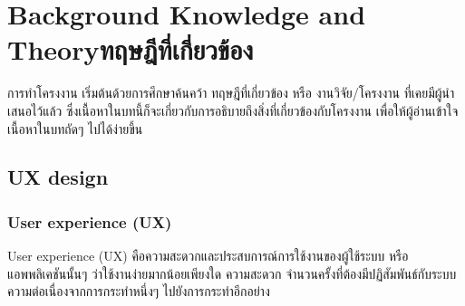 \chapter{\ifenglish Background Knowledge and Theory\else ทฤษฎีที่เกี่ยวข้อง\fi}

การทำโครงงาน เริ่มต้นด้วยการศึกษาค้นคว้า ทฤษฎีที่เกี่ยวข้อง หรือ งานวิจัย/โครงงาน 
ที่เคยมีผู้นำเสนอไว้แล้ว ซึ่งเนื้อหาในบทนี้ก็จะเกี่ยวกับการอธิบายถึงสิ่งที่เกี่ยวข้องกับโครงงาน 
เพื่อให้ผู้อ่านเข้าใจเนื้อหาในบทถัดๆ ไปได้ง่ายขึ้น

\section{UX design}
\subsection{User experience (UX)}
User experience (UX) คือความสะดวกและประสบการณ์การใช้งานของผู้ใช้ระบบ 
หรือแอพพลิเคชันนั้นๆ ว่าใช้งานง่ายมากน้อยเพียงใด ความสะดวก จำนวนครั้งที่ต้องมีปฏิสัมพันธ์กับระบบ
ความต่อเนื่องจากการกระทำหนึ่งๆ ไปยังการกระทำอีกอย่าง

